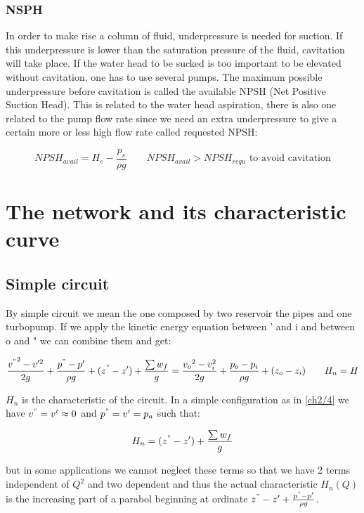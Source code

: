 \subsubsection{NSPH}
In order to make rise a column of fluid, underpressure is needed for suction. If this underpressure is lower than the saturation pressure of the fluid, cavitation will take place. If the water head to be sucked is too important to be elevated without cavitation, one has to use several pumps. The maximum possible underpressure before cavitation is called the available NPSH (Net Positive Suction Head). This is related to the water head aspiration, there is also one related to the pump flow rate since we need an extra underpressure to give a certain more or less high flow rate called requested NPSH: 

\begin{equation}
NPSH _{avail}  = H_e - \frac{p_s}{\rho g} \qquad NPSH_{avail} > NPSH _{requ} \mbox{ to avoid cavitation}
\end{equation}

\section{The network and its characteristic curve}
\subsection{Simple circuit}
By simple circuit we mean the one composed by two reservoir the pipes and one turbopump. If we apply the kinetic energy equation between ' and i and between o and " we can combine them and get: 

\begin{equation}
\frac{{v^"}^2-v'^2}{2g} + \frac{p^"-p'}{\rho g} + (z^"-z') +  \frac{\sum w_f}{g} =\frac{{v_o}^2-v_i^2}{2g} + \frac{p_o-p_i}{\rho g} + (z_o-z_i)  \qquad H_n = H
\end{equation}

$H_n$ is the characteristic of the circuit. In a simple configuration as in \autoref{ch2/4} we have $v^" = v' \approx 0$ and $p^" = v' = p_a$ such that: 

\begin{equation}
H_n = (z^" - z') + \frac{\sum w_f}{g}
\end{equation}

but in some applications we cannot neglect these terms so that we have 2 terms independent of $Q^2$ and two dependent and thus the actual characteristic $H_n(Q)$ is the increasing part of a parabol beginning at ordinate $z^"-z' + \frac{p^"-p'}{\rho g}$.

